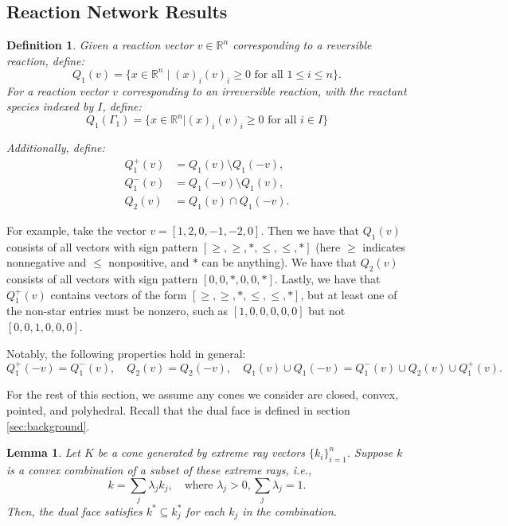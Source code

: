 \documentclass{article}
\newtheorem{lem}{Lemma}
\newtheorem{define}{Definition}
\begin{document}
\subsection{Reaction Network Results}

\begin{define}
\label{def:Q regions}
    Given a reaction vector $v \in \mathbb{R}^n$ corresponding to a reversible reaction, define:
    \[
    Q_1(v) = \{x \in \mathbb{R}^n \mid (x)_i(v)_i \geq 0 \text{ for all } 1 \leq i \leq n \}.
    \]
    For a reaction vector $v$ corresponding to an irreversible reaction, with the reactant species indexed by $I$, define:
    \[
    Q_1(\Gamma_1) = \{x \in \mathbb{R}^n| (x)_i (v)_i \geq 0 \text{ for all } i \in I \}
    \]
    
    Additionally, define:
    \begin{align*}
    Q_1^+(v) &= Q_1(v) \setminus Q_1(-v), \\
    Q_1^-(v) &= Q_1(-v) \setminus Q_1(v), \\
    Q_2(v) &= Q_1(v) \cap Q_1(-v).
    \end{align*}
\end{define}


For example, take the vector $v = [1,2,0,-1,-2,0]$. Then we have that $Q_1(v)$ consists of all vectors with sign pattern $[\geq,\geq,*,\leq,\leq,*]$ (here $\geq$ indicates nonnegative and $\leq$ nonpositive, and $*$ can be anything). We have that $Q_2(v)$ consists of all vectors with sign pattern $[0,0,*,0,0,*]$. Lastly, we have that $Q_1^+(v)$ contains vectors of the form $[\geq,\geq,*,\leq,\leq,*]$, but at least one of the non-star entries must be nonzero, such as $[1,0,0,0,0,0]$ but not $[0,0,1,0,0,0]$.

Notably, the following properties hold in general:
\[
Q_1^+(-v) = Q_1^-(v), \quad Q_2(v) = Q_2(-v), \quad Q_1(v) \cup Q_1(-v) = Q_1^-(v) \cup Q_2(v) \cup Q_1^+(v).
\]







For the rest of this section, we assume any cones we consider are closed, convex, pointed, and polyhedral. Recall that the dual face is defined in section \ref{sec:background}.


\begin{lem}
\label{lem:only need consider extreme rays}
Let \( K \) be a cone generated by extreme ray vectors \( \{k_i\}_{i=1}^n \). Suppose \( k \) is a convex combination of a subset of these extreme rays, i.e.,  
\[
k = \sum_j \lambda_j k_j, \quad \text{where } \lambda_j > 0, \sum_j \lambda_j = 1.
\]
Then, the dual face satisfies \( k^* \subseteq k_j^* \) for each \( k_j \) in the combination.
\end{lem}
\end{document}

